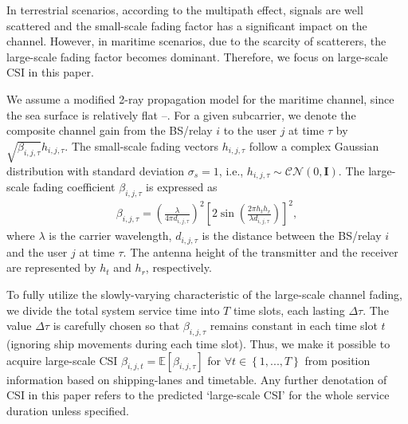 \documentclass[journal]{IEEEtran}
\begin{document}
   In terrestrial scenarios, according to the multipath effect, signals are well scattered and the small-scale fading factor has a significant impact on the channel. However, in maritime scenarios, due to the scarcity of scatterers, the large-scale fading factor becomes dominant. Therefore, we focus on large-scale CSI in this paper. 
   
   We assume a modified 2-ray propagation model for the maritime channel, since the sea surface is relatively flat \cite{p0}--\cite{p2}. For a given subcarrier, we denote the composite channel gain from the BS/relay $i$ to the user $j$ at time $\tau $ by $\sqrt {{\beta _{i,j,\tau }}} {h_{i,j,\tau }}$. The small-scale fading vectors ${h_{i,j,\tau }}$ follow a complex Gaussian distribution with standard deviation ${\sigma _s} = 1$, i.e., ${h_{i,j,\tau }} \sim \mathcal{CN}(0, \mathbf{I})$. The large-scale fading coefficient ${\beta _{i,j,\tau }}$ is expressed as
   \begin{align}
   {\beta _{i,j,\tau }} = {\left( {\frac{\lambda }{{4\pi {d_{i,j,\tau }}}}} \right)^2}{\left[ {2\sin \left( {\frac{{2\pi {h_t}{h_r}}}{{\lambda {d_{i,j,\tau }}}}} \right)} \right]^2} ,
   \end{align}
   where $\lambda $ is the carrier wavelength, ${d_{i,j,\tau }}$ is the distance between the BS/relay $i$ and the user $j$ at time $\tau $. The antenna height of the transmitter and the receiver are represented by $h_t$ and $h_r$, respectively. 
   
   To fully utilize the slowly-varying characteristic of the large-scale channel fading, we divide the total system service time into $T$ time slots, each lasting $\Delta \tau$. The value $\Delta \tau$ is carefully chosen so that $\beta _{i,j,\tau }$ remains constant in each time slot $t$ (ignoring ship movements during each time slot). Thus, we make it possible to acquire large-scale CSI $\beta _{i,j,t} = \mathbb{E} \left [ {\beta _{i,j,\tau }} \right ]$ for $\forall t \in \left\{ {1,...,T} \right\}$ from position information based on shipping-lanes and timetable. Any further denotation of CSI in this paper refers to the predicted `large-scale CSI' for the whole service duration unless specified. 
  
\end{document}
